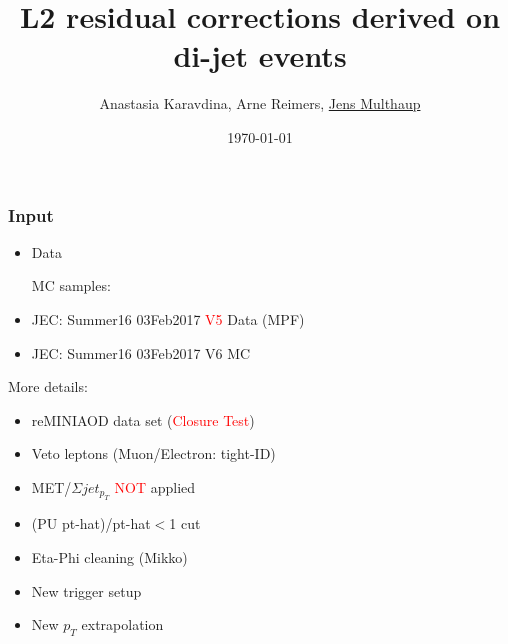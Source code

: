 \documentclass[t,compress]{beamer}
\title[L2 residual corrections]{L2 residual corrections derived on di-jet events}
\author[Jens Multhaup]{Anastasia Karavdina, Arne Reimers, \underline{Jens Multhaup}}
\institute[UHH]{University of Hamburg}
\date{\today}
\begin{document}
\begin{frame}
 \titlepage
\end{frame}

 \begin{frame}
  \frametitle{Input}
  \begin{itemize}
   \item Data
   \begin{itemize}
  \end{itemize}
   MC samples:
    \begin{itemize}
    \end{itemize}
  \item JEC: Summer16 03Feb2017 \textcolor{red}{V5} Data (MPF)
  \item JEC: Summer16 03Feb2017 V6 MC
  \end{itemize}

More details:
\begin{itemize}
\item reMINIAOD data set (\textcolor{red}{Closure Test})
\item Veto leptons (Muon/Electron: tight-ID)
\item MET/$\Sigma jet_{p_T}$ \textcolor{red}{NOT} applied 
\item (PU pt-hat)/pt-hat$<$1 cut
\item Eta-Phi cleaning (Mikko)
\item New trigger setup
\item New $p_T$ extrapolation
 \end{itemize}
 \end{frame}
    
\end{document}
